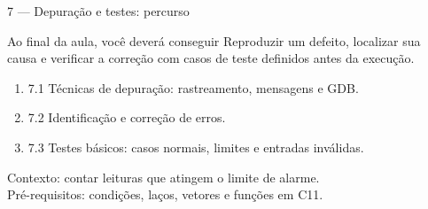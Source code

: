 \begin{frame}{7 — Depuração e testes: percurso}
\begin{block}{Ao final da aula, você deverá conseguir}
Reproduzir um defeito, localizar sua causa e verificar a correção com casos de teste definidos antes da execução.
\end{block}
\begin{enumerate}
\item 7.1 Técnicas de depuração: rastreamento, mensagens e GDB.
\item 7.2 Identificação e correção de erros.
\item 7.3 Testes básicos: casos normais, limites e entradas inválidas.
\end{enumerate}
\small Contexto: contar leituras que atingem o limite de alarme.\\
Pré-requisitos: condições, laços, vetores e funções em C11.
\end{frame}
